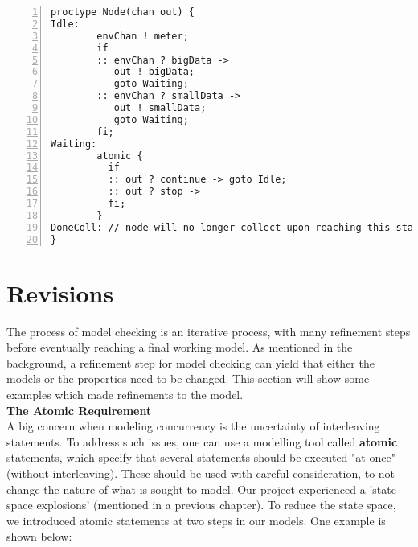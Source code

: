 


\begin{lstlisting}[caption={Node code},language=Promela, numbers=left, basicstyle=\footnotesize, tabsize=2]
proctype Node(chan out) {
Idle:   
        envChan ! meter; 
        if
        :: envChan ? bigData -> 
           out ! bigData; 
           goto Waiting;
        :: envChan ? smallData -> 
           out ! smallData; 
           goto Waiting;
        fi;
Waiting:
        atomic {
          if
          :: out ? continue -> goto Idle;
          :: out ? stop -> 
          fi;
        }
DoneColl: // node will no longer collect upon reaching this state
}
\end{lstlisting}


\section{Revisions} \label{revisions}

The process of model checking is an iterative process, with many refinement steps before eventually reaching a final working model. As mentioned in the background, a refinement step for model checking can yield that either the models or the properties need to be changed. This section will show some examples which made refinements to the model. \\

\textbf{The Atomic Requirement} \\


A big concern when modeling concurrency is the uncertainty of interleaving statements. To address such issues, one can use a modelling tool called \textbf{atomic} statements, which specify that several statements should be executed "at once" (without interleaving). These should be used with careful consideration, to not change the nature of what is sought to model. Our project experienced a 'state space explosions' (mentioned in a previous chapter). To reduce the state space, we introduced atomic statements at two steps in our models. One example is shown below:

